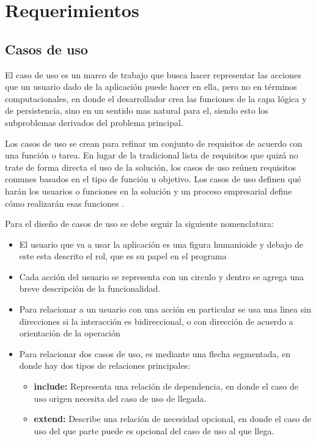 \chapter{Requerimientos}
\section{Casos de uso}

El caso de uso es un marco de trabajo que busca hacer representar las acciones que un usuario dado de la aplicación puede hacer en ella, pero no en términos computacionales, en donde el desarrollador crea las funciones de la capa lógica y de persistencia, sino en un sentido mas natural para el, siendo esto los subproblemas derivados del problema principal.

Los casos de uso se crean para refinar un conjunto de requisitos de acuerdo con una función o tarea. En lugar de la tradicional lista de requisitos que quizá no trate de forma directa el uso de la solución, los casos de uso reúnen requisitos comunes basados en el tipo de función u objetivo. Los casos de uso definen qué harán los usuarios o funciones en la solución y un proceso empresarial define cómo realizarán esas funciones \cite{Pw2CU}.

Para el diseño de casos de uso se debe seguir la siguiente nomenclatura:
\begin{itemize}
	\item El usuario que va a usar la aplicación es una figura humanioide y debajo de este esta descrito el rol, que es su papel en el programa
	\item Cada acción del usuario se representa con un circulo y dentro se agrega una breve descripción de la funcionalidad.
	\item Para relacionar a un usuario con una acción en particular se usa una linea sin direcciones si la interacción es bidireccional, o con dirección de acuerdo a orientación de la operación
	\item Para relacionar dos casos de uso, es mediante una flecha segmentada, en donde hay dos tipos de relaciones principales:
	\begin{itemize}
		\item  \textbf{include:} Representa una relación de dependencia, en donde el caso de uso origen necesita del caso de uso de llegada.
		\item \textbf{extend:} Describe una relación de necesidad opcional, en donde el caso de uso del que parte puede es opcional del caso de uso al que llega.
	\end{itemize}
\end{itemize}


